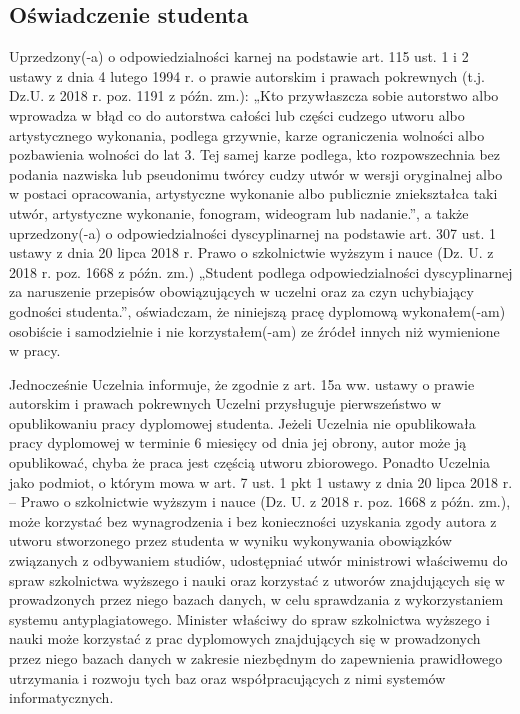 
\vspace*{2cm}
\begin{addmargin}[1em]{1em}%
\hspace{8mm}
\begin{center}
\subsection*{Oświadczenie studenta}
\end{center}
Uprzedzony(-a) o odpowiedzialności karnej na podstawie art. 115 ust. 1 i 2 ustawy z dnia 4 lutego 1994 r. o prawie autorskim i prawach pokrewnych (t.j. Dz.U. z 2018 r. poz. 1191 z późn. zm.): „Kto przywłaszcza sobie autorstwo albo wprowadza w bł\k{a}d co do autorstwa całości lub części cudzego utworu albo artystycznego wykonania, podlega grzywnie, karze ograniczenia wolności albo pozbawienia wolności do lat 3. Tej samej karze podlega, kto rozpowszechnia bez podania nazwiska lub pseudonimu twórcy cudzy utwór w wersji oryginalnej albo w postaci opracowania, artystyczne wykonanie albo publicznie zniekształca taki utwór, artystyczne wykonanie, fonogram, wideogram lub nadanie.”, a także uprzedzony(-a) o odpowiedzialności dyscyplinarnej na podstawie art. 307 ust. 1 ustawy z dnia 20 lipca 2018 r. Prawo o szkolnictwie wyższym i nauce (Dz. U. z 2018 r. poz. 1668 z późn. zm.) „Student podlega odpowiedzialności dyscyplinarnej za naruszenie przepisów obowi\k{a}zuj\k{a}cych w uczelni oraz za czyn uchybiaj\k{a}cy godności studenta.”, oświadczam, że niniejsz\k{a} pracę dyplomow\k{a} wykonałem(-am) osobiście i samodzielnie i nie korzystałem(-am) ze źródeł innych niż wymienione w pracy. 

\medskip
Jednocześnie Uczelnia informuje, że zgodnie z art. 15a ww. ustawy o prawie autorskim i prawach pokrewnych Uczelni przysługuje pierwszeństwo w opublikowaniu pracy dyplomowej studenta. Jeżeli Uczelnia nie opublikowała pracy dyplomowej w terminie 6 miesięcy od dnia jej obrony, autor może j\k{a} opublikować, chyba że praca jest części\k{a} utworu zbiorowego. Ponadto Uczelnia jako podmiot, o którym mowa w art. 7 ust. 1 pkt 1 ustawy z dnia 20 lipca 2018 r. – Prawo o szkolnictwie wyższym i nauce (Dz. U. z 2018 r. poz. 1668 z późn. zm.), może korzystać bez wynagrodzenia i bez konieczności uzyskania zgody autora z utworu stworzonego przez studenta w wyniku wykonywania obowi\k{a}zków zwi\k{a}zanych z odbywaniem studiów, udostępniać utwór ministrowi właściwemu do spraw szkolnictwa wyższego i nauki oraz korzystać z utworów znajduj\k{a}cych się w prowadzonych przez niego bazach danych, w celu sprawdzania z wykorzystaniem systemu antyplagiatowego. Minister właściwy do spraw szkolnictwa wyższego i nauki może korzystać z prac dyplomowych znajduj\k{a}cych się w prowadzonych przez niego bazach danych w zakresie niezbędnym do zapewnienia prawidłowego utrzymania i rozwoju tych baz oraz współpracuj\k{a}cych z nimi systemów informatycznych. 

\end{addmargin}
\vspace{2cm}

\begin{addmargin}{1em}
\end{addmargin}